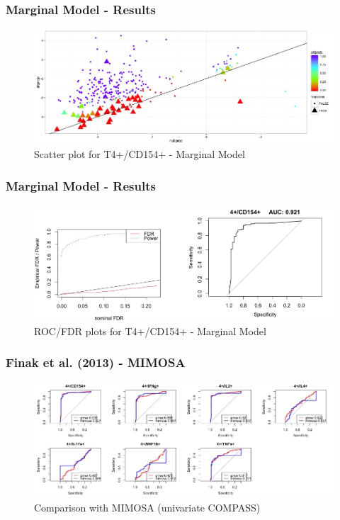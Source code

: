 \documentclass{beamer}
\theoremstyle{definition}
\begin{document}

\begin{frame}
\frametitle{Marginal Model - Results}
\begin{center}
\begin{figure}[]
\includegraphics[width=12 cm]{figures/T4cd154scatter} \caption{Scatter plot for T4+/CD154+ - Marginal Model}
\end{figure}
\end{center}
\end{frame}


\begin{frame}
\frametitle{Marginal Model - Results}
\begin{figure}[]
\includegraphics[width=12 cm]{figures/T4cd154roc} \caption{ROC/FDR plots for T4+/CD154+ - Marginal Model}
\end{figure}
\end{frame}


\begin{frame}
\frametitle{Finak et al. (2013) - MIMOSA}
\begin{figure}[]
\includegraphics[width=12 cm]{figures/mimosaComparison} 
\caption{Comparison with MIMOSA (univariate COMPASS)}
\end{figure}
\end{frame}
\end{document}
